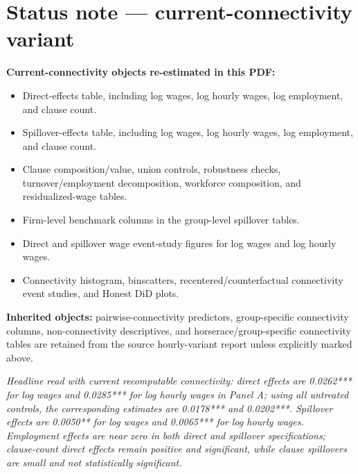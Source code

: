 \documentclass[11pt]{article}
\begin{document}
\clearpage
\section*{Status note --- current-connectivity variant}

\noindent\textbf{Current-connectivity objects re-estimated in this PDF:}
\begin{itemize}
\item Direct-effects table, including log wages, log hourly wages, log employment, and clause count.
\item Spillover-effects table, including log wages, log hourly wages, log employment, and clause count.
\item Clause composition/value, union controls, robustness checks, turnover/employment decomposition, workforce composition, and residualized-wage tables.
\item Firm-level benchmark columns in the group-level spillover tables.
\item Direct and spillover wage event-study figures for log wages and log hourly wages.
\item Connectivity histogram, binscatters, recentered/counterfactual connectivity event studies, and Honest DiD plots.
\end{itemize}

\noindent\textbf{Inherited objects:} pairwise-connectivity predictors, group-specific connectivity columns, non-connectivity descriptives, and horserace/group-specific connectivity tables are retained from the source hourly-variant report unless explicitly marked above.

\medskip
\noindent\textit{Headline read with current recomputable connectivity: direct effects are 0.0262*** for log wages and 0.0285*** for log hourly wages in Panel A; using all untreated controls, the corresponding estimates are 0.0178*** and 0.0202***. Spillover effects are 0.0050** for log wages and 0.0065*** for log hourly wages. Employment effects are near zero in both direct and spillover specifications; clause-count direct effects remain positive and significant, while clause spillovers are small and not statistically significant.}
\end{document}
